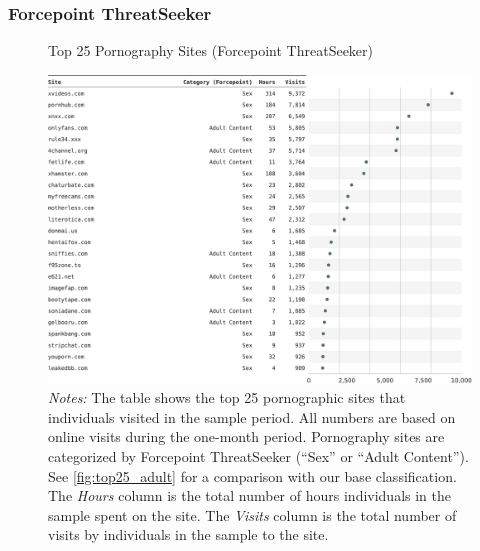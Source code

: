 \documentclass[12pt,twoside]{article}
\begin{document}
\subsubsection{Forcepoint ThreatSeeker}
\begin{figure}[!ht]
	\centering
	\caption{Top 25 Pornography Sites (Forcepoint ThreatSeeker)}
	\includegraphics[width=\textwidth]{figs/top_25_adultsites_forcepoint_threatseeker.pdf}
	\caption*{\footnotesize \emph{Notes:} 
		The table shows the top 25 pornographic sites that individuals visited in the sample period.
            All numbers are based on online visits during the one-month period.
		Pornography sites are categorized by Forcepoint ThreatSeeker (``Sex'' or ``Adult Content'').
            See \cref{fig:top25_adult} for a comparison with our base classification.
    	The \emph{Hours} column is the total number of hours individuals in the sample spent on the site. 
    	The \emph{Visits} column is the total number of visits by individuals in the sample to the site.            
	}
	\label{fig:top25_adult_forcepoint}
\end{figure}





\end{document}
